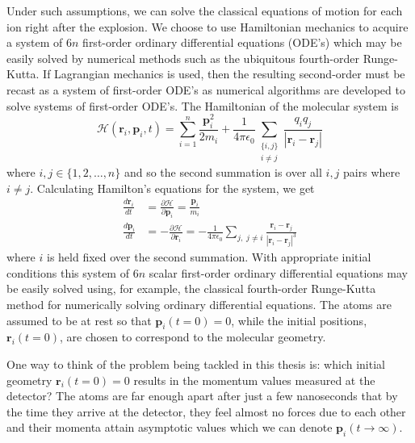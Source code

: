 Under such assumptions, we can solve the classical equations of motion for each ion right after the explosion. We choose to use Hamiltonian mechanics to acquire a system of $6n$ first-order ordinary differential equations (ODE's) which may be easily solved by numerical methods such as the ubiquitous fourth-order Runge-Kutta. If Lagrangian mechanics is used, then the resulting second-order must be recast as a system of first-order ODE's as numerical algorithms are developed to solve systems of first-order ODE's. The Hamiltonian of the molecular system is
\begin{equation}
\mathcal{H}(\mathbf{r}_i, \mathbf{p}_i, t) = \sum_{i=1}^n \frac{\mathbf{p}_i^2}{2m_i} + \frac{1}{4\pi\epsilon_0}\sum_{\substack{\lbrace i,j\rbrace\\ i \ne j}} \frac{q_iq_j}{|\mathbf{r}_i-\mathbf{r}_j|}
\end{equation}
where $i,j \in \lbrace 1,2,\dots, n \rbrace$ and so the second summation is over all $i,j$ pairs where $i \ne j$. Calculating Hamilton's equations for the system, we get
\begin{subequations}
  \begin{align}
  \frac{d\mathbf{r}_i}{dt} &= \frac{\partial \mathcal{H}}{\partial \mathbf{p}_i} = \frac{\mathbf{p}_i}{m_i} \\
  \frac{d\mathbf{p}_i}{dt} &= -\frac{\partial \mathcal{H}}{\partial \mathbf{r}_i} = -\frac{1}{4\pi\epsilon_0}\sum_{j, \; j \ne i} \frac{\mathbf{r}_i - \mathbf{r}_j}{|\mathbf{r}_i - \mathbf{r}_j|^3}
  \end{align}
\end{subequations}
where $i$ is held fixed over the second summation. With appropriate initial conditions this system of $6n$ scalar first-order ordinary differential equations may be easily solved using, for example, the classical fourth-order Runge-Kutta method for numerically solving ordinary differential equations. The atoms are assumed to be at rest so that $\mathbf{p}_i(t=0) = 0$, while the initial positions, $\mathbf{r}_i(t=0)$, are chosen to correspond to the molecular geometry.

One way to think of the problem being tackled in this thesis is: which initial geometry $\mathbf{r}_i(t=0) = 0$ results in the momentum values measured at the detector? The atoms are far enough apart after just a few nanoseconds that by the time they arrive at the detector, they feel almost no forces due to each other and their momenta attain asymptotic values which we can denote $\mathbf{p}_i(t\rightarrow\infty)$.

